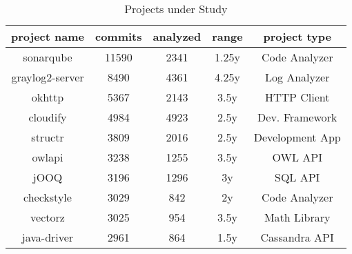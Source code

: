 \begin{table}
	\caption{Projects under Study}
	\label{tableProjects}
	\centering
	\begin{tabular}{ | c | c | c | c | c | }
		\hline
		project name & commits & analyzed & range & project type \\
		\hline
		sonarqube & 11590 & 2341 & 1.25y & Code Analyzer \\
		graylog2-server & 8490 & 4361 & 4.25y & Log Analyzer \\
		okhttp & 5367 & 2143 & 3.5y & HTTP Client \\
		cloudify & 4984 & 4923 & 2.5y & Dev. Framework \\
		structr & 3809 & 2016 & 2.5y & Development App \\
		owlapi & 3238 & 1255 & 3.5y & OWL API \\
		jOOQ & 3196 & 1296 & 3y & SQL API \\
		checkstyle & 3029 & 842 & 2y & Code Analyzer \\
		vectorz & 3025 & 954 & 3.5y & Math Library \\
		java-driver & 2961 & 864 & 1.5y & Cassandra API \\
		\hline
	\end{tabular}
\end{table}
